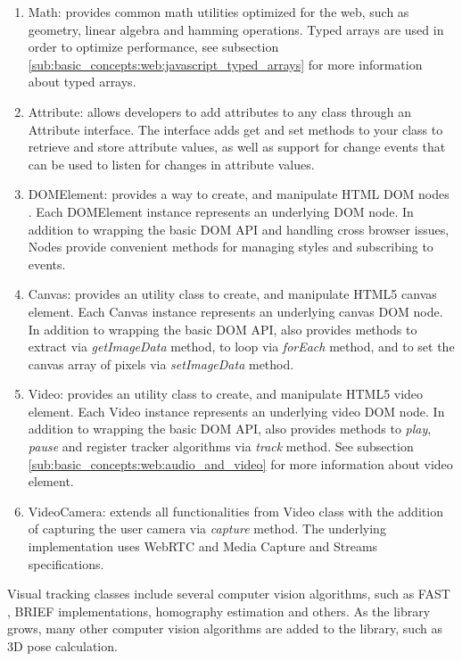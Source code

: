 \begin{enumerate}
  \item Math: provides common math utilities optimized for the web, such as geometry, linear algebra \cite{Hartley2004} and hamming operations. Typed arrays are used in order to optimize performance, see subsection \ref{sub:basic_concepts:web:javascript_typed_arrays} for more information about typed arrays.
  \item Attribute: allows developers to add attributes to any class through an Attribute interface. The interface adds get and set methods to your class to retrieve and store attribute values, as well as support for change events that can be used to listen for changes in attribute values.
  \item DOMElement: provides a way to create, and manipulate HTML DOM nodes \cite{WC2006}. Each DOMElement instance represents an underlying DOM node. In addition to wrapping the basic DOM API and handling cross browser issues, Nodes provide convenient methods for managing styles and subscribing to events.
  \item Canvas: provides an utility class to create, and manipulate HTML5 canvas element. Each Canvas instance represents an underlying canvas DOM node. In addition to wrapping the basic DOM API, also provides methods to extract via \textit{getImageData} method, to loop via \textit{forEach} method, and to set the canvas array of pixels via \textit{setImageData} method.
  \item Video: provides an utility class to create, and manipulate HTML5 video element. Each Video instance represents an underlying video DOM node. In addition to wrapping the basic DOM API, also provides methods to \textit{play}, \textit{pause} and register tracker algorithms via \textit{track} method. See subsection \ref{sub:basic_concepts:web:audio_and_video} for more information about video element.
  \item VideoCamera: extends all functionalities from Video class with the addition of capturing the user camera via \textit{capture} method. The underlying implementation uses WebRTC \cite{WebRTC2013} and Media Capture and Streams \cite{MediaCapture2013} specifications.
\end{enumerate}

Visual tracking classes include several computer vision algorithms, such as FAST \cite{RostenFaster2010}, BRIEF \cite{Calonder2010} implementations, homography estimation and others. As the library grows, many other computer vision algorithms are added to the library, such as 3D pose calculation.

